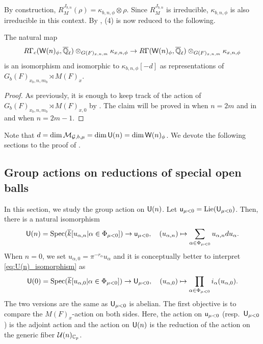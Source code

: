 \documentclass[12pt,reqno]{amsart}
\begin{document}
By construction, $R_M^{J_{b, n}}(\rho) = \kappa_{b, n, \phi} \otimes \rho$. Since $R_M^{J_{b, n}}$ is irreducible, $\kappa_{b, n, \phi}$ is also irreducible in this context. By ,  (4) is now reduced to the following. 

\begin{prop} \label{prop:cohomology_reduction}
    The natural map 
    \[
        R\Gamma_c({\mathsf{W}}(n)_\phi, {\overline{\mathbb{Q}}_\ell}) \otimes_{G(F)_{x, n, m}} \kappa_{x, n, \phi} \to R\Gamma({\mathsf{W}}(n)_\phi, {\overline{\mathbb{Q}}_\ell}) \otimes_{G(F)_{x, n, m}} \kappa_{x, n, \phi}
    \]
    is an isomorphism and isomorphic to $\kappa_{b, n, \phi}[-d]$ as representations of $G_b(F)_{x_b, n, m_b} \rtimes M(F)_x$. 
\end{prop}

\begin{proof}
    As previously, it is enough to keep track of the action of $G_b(F)_{x_b, n, m_b} \rtimes M(F)_{x, 0}$ by . The claim will be proved in  when $n = 2m$ and in  and  when $n = 2m - 1$.
\end{proof}

Note that $d = \dim {\mathcal{M}}_{{\mathcal{G}}, b, \mu} = \dim {\mathsf{U}}(n) = \dim {\mathsf{W}}(n)_\phi$. We devote the following sections to the proof of . 

\subsection{Group actions on reductions of special open balls}

In this section, we study the group action on ${\mathsf{U}}(n)$. Let ${\mathsf{u}}_{\mu < 0} = {\operatorname{Lie}}({\mathsf{U}}_{\mu < 0})$. Then, there is a natural isomorphism
\begin{equation} \label{eq:U(n)_isomorphism}
    {\mathsf{U}}(n) = {\operatorname{Spec}}({\overline{k}}[u_{\alpha, n} \vert \alpha \in \Phi_{\mu < 0}]) \to {\mathsf{u}}_{\mu < 0}, \quad (u_{\alpha, n}) \mapsto \sum_{\alpha \in \Phi_{\mu < 0}} u_{\alpha, n}du_\alpha.
\end{equation}
When $n = 0$, we set $u_{\alpha, 0} = \pi^{-r_\alpha} u_\alpha$ and it is conceptually better to interpret \eqref{eq:U(n)_isomorphism} as 
\begin{equation} \label{eq:U(0)_isomorphism}
    {\mathsf{U}}(0) = {\operatorname{Spec}}({\overline{k}}[u_{\alpha, 0} \vert \alpha \in \Phi_{\mu < 0}]) \to {\mathsf{U}}_{\mu < 0}, \quad (u_{\alpha, 0}) \mapsto \prod_{\alpha \in \Phi_{\mu < 0}} i_\alpha(u_{\alpha, 0}).
\end{equation}
The two versions are the same as ${\mathsf{U}}_{\mu < 0}$ is abelian. The first objective is to compare the $M(F)_x$-action on both sides. Here, the action on ${\mathsf{u}}_{\mu < 0}$ (resp.\ ${\mathsf{U}}_{\mu < 0}$) is the adjoint action and the action on ${\mathsf{U}}(n)$ is the reduction of the action on the generic fiber ${\mathcal{U}}(n)_{\mathbb{C}_p}$.
\end{document}
